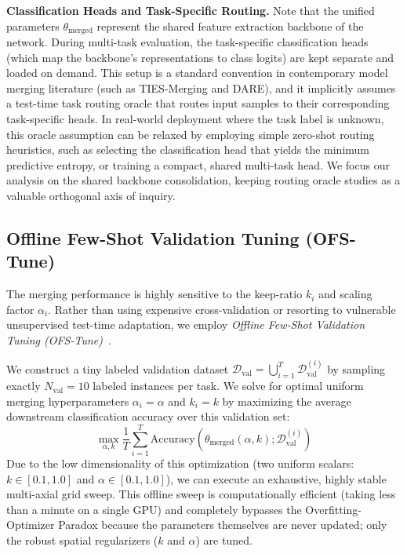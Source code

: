 \textbf{Classification Heads and Task-Specific Routing.}
Note that the unified parameters $\theta_{\text{merged}}$ represent the shared feature extraction backbone of the network. During multi-task evaluation, the task-specific classification heads (which map the backbone's representations to class logits) are kept separate and loaded on demand. This setup is a standard convention in contemporary model merging literature (such as TIES-Merging and DARE), and it implicitly assumes a test-time task routing oracle that routes input samples to their corresponding task-specific heads. In real-world deployment where the task label is unknown, this oracle assumption can be relaxed by employing simple zero-shot routing heuristics, such as selecting the classification head that yields the minimum predictive entropy, or training a compact, shared multi-task head. We focus our analysis on the shared backbone consolidation, keeping routing oracle studies as a valuable orthogonal axis of inquiry.

\subsection{Offline Few-Shot Validation Tuning (OFS-Tune)}
The merging performance is highly sensitive to the keep-ratio $k_i$ and scaling factor $\alpha_i$. Rather than using expensive cross-validation or resorting to vulnerable unsupervised test-time adaptation, we employ \emph{Offline Few-Shot Validation Tuning (OFS-Tune)}~\cite{regcalmerge}. 

We construct a tiny labeled validation dataset $\mathcal{D}_{\text{val}} = \bigcup_{i=1}^T \mathcal{D}_{\text{val}}^{(i)}$ by sampling exactly $N_{\text{val}} = 10$ labeled instances per task. We solve for optimal uniform merging hyperparameters $\alpha_i = \alpha$ and $k_i = k$ by maximizing the average downstream classification accuracy over this validation set:
\begin{equation}
\max_{\alpha, k} \frac{1}{T} \sum_{i=1}^T \text{Accuracy}\left(\theta_{\text{merged}}(\alpha, k); \mathcal{D}_{\text{val}}^{(i)}\right)
\end{equation}
Due to the low dimensionality of this optimization (two uniform scalars: $k \in [0.1, 1.0]$ and $\alpha \in [0.1, 1.0]$), we can execute an exhaustive, highly stable multi-axial grid sweep. This offline sweep is computationally efficient (taking less than a minute on a single GPU) and completely bypasses the Overfitting-Optimizer Paradox because the parameters themselves are never updated; only the robust spatial regularizers ($k$ and $\alpha$) are tuned.


